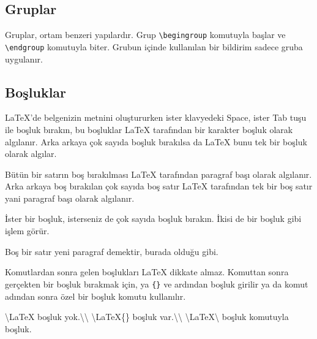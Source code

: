 \documentclass[
  10pt,
]{scrbook}
\newenvironment{Shaded}{\begin{snugshade}}{\end{snugshade}}
\newcommand{\FunctionTok}[1]{\textcolor[rgb]{0.00,0.00,0.00}{#1}}
\newcommand{\NormalTok}[1]{#1}
\theoremstyle{definition}
\theoremstyle{definition}
\theoremstyle{definition}
\theoremstyle{definition}
\theoremstyle{remark}
\begin{document}
\hypertarget{gruplar}{%
\subsection{Gruplar}\label{gruplar}}

Gruplar, ortam benzeri yapılardır. Grup \texttt{\textbackslash{}begingroup} komutuyla başlar
ve \texttt{\textbackslash{}endgroup} komutuyla biter. Grubun içinde kullanılan bir bildirim
sadece gruba uygulanır.

\hypertarget{bosluk}{%
\subsection{Boşluklar}\label{bosluk}}

LaTeX'de belgenizin metnini oluştururken ister klavyedeki Space, ister
Tab tuşu ile boşluk bırakın, bu boşluklar LaTeX tarafından bir karakter
boşluk olarak algılanır. Arka arkaya çok sayıda boşluk bırakılsa da
LaTeX bunu tek bir boşluk olarak algılar.

Bütün bir satırın boş bırakılması LaTeX tarafından paragraf başı olarak
algılanır. Arka arkaya boş bırakılan çok sayıda boş satır LaTeX
tarafından tek bir boş satır yani paragraf başı olarak algılanır.

\begin{Shaded}
\begin{Highlighting}[]
\NormalTok{ İster bir boşluk, isterseniz de çok         sayıda boşluk bırakın. }
\NormalTok{İkisi de bir boşluk gibi işlem görür. }

\NormalTok{Boş bir satır yeni paragraf demektir, burada olduğu gibi.}
\end{Highlighting}
\end{Shaded}

Komutlardan sonra gelen boşlukları LaTeX dikkate almaz. Komuttan sonra
gerçekten bir boşluk bırakmak için, ya \texttt{\{\}} ve ardından boşluk girilir
ya da komut adından sonra özel bir boşluk komutu kullanılır.

\begin{Shaded}
\begin{Highlighting}[]
\FunctionTok{\textbackslash{}LaTeX}\NormalTok{  boşluk yok.}\FunctionTok{\textbackslash{}\textbackslash{}}
\FunctionTok{\textbackslash{}LaTeX}\NormalTok{\{\} boşluk var.}\FunctionTok{\textbackslash{}\textbackslash{}}
\FunctionTok{\textbackslash{}LaTeX\textbackslash{} }\NormalTok{boşluk komutuyla  boşluk.}
\end{Highlighting}
\end{Shaded}
\end{document}
